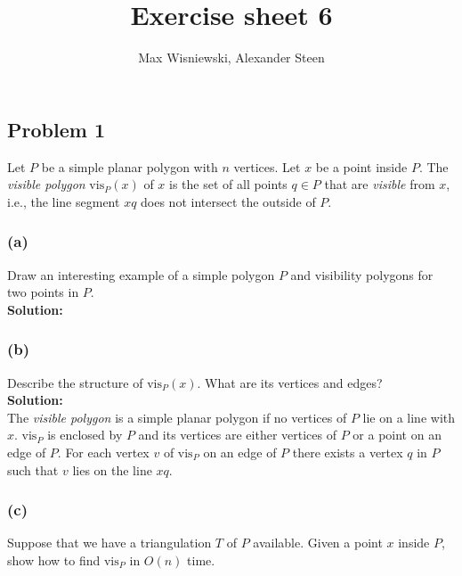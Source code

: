 \documentclass[11pt,a4paper,ngerman]{article}
\date{}
\title{Exercise sheet 6}
\author{Max Wisniewski, Alexander Steen}
\begin{document}

\renewcommand{\figurename}{Figure}

\maketitle
\thispagestyle{fancy}

\subsection*{Problem 1}

Let $P$ be a simple planar polygon with $n$ vertices. Let $x$ be a point inside $P$. The \emph{visible polygon} $\text{vis}_P(x)$ of $x$ is the set of all points $q \in P$ that are \emph{visible} from $x$, i.e., the line segment $xq$ does not intersect the outside of $P$.

\subsubsection*{(a)}
Draw an interesting example of a simple polygon $P$ and visibility polygons
for two points in $P$.\\

\textbf{Solution:}\\

\vspace{15cm}

\subsubsection*{(b)}
Describe the structure of $\text{vis}_P(x)$. What are its vertices and edges?\\

\textbf{Solution:}\\

The \emph{visible polygon} is a simple planar polygon if no vertices of $P$ lie on a line with $x$. $\text{vis}_P$ is enclosed by $P$ and its vertices are
either vertices of $P$ or a point on an edge of $P$. For each vertex $v$ of $\text{vis}_P$ on an edge of $P$ there exists a vertex $q$ in $P$ such that $v$ lies
on the line $xq$.

\subsubsection*{(c)}
Suppose that we have a triangulation $T$ of $P$ available. Given a point $x$ inside $P$, show how to find $\text{vis}_P$ in $O(n)$ time.\\
\end{document}
